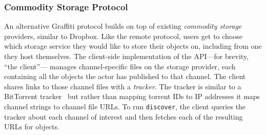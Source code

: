 





\subsubsection{Commodity Storage Protocol}
\label{above-and-below:commodity-storage-protocol}

An alternative Graffiti protocol builds on top of existing
\emph{commodity storage} providers,
similar to Dropbox.
Like the remote protocol, users get to choose which storage
service they would like to store their objects on, including
from one they host themselves.
The client-side implementation of the API---for brevity, ``the client''---%
manages channel-specific files on the storage provider,
each containing all the objects the actor has published to that channel.
The client shares links to those channel files with a \emph{tracker}.
The tracker is similar to a BitTorrent tracker~\cite{bittorrent} but
rather than mapping torrent IDs to IP addresses
it maps channel strings to channel file URLs.
To run \texttt{discover}, the client queries the tracker
about each channel of interest and then fetches each of the resulting URLs for objects.

